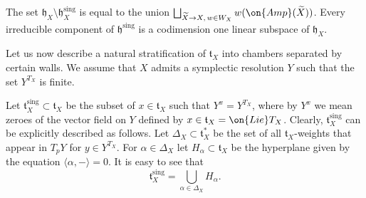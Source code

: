\documentclass[12pt]{amsart}
\begin{document}
\begin{prop}\label{namikawa's result_descr_of_h_sing}
The set $\mathfrak{h}_X \setminus \mathfrak{h}^{\mathrm{sing}}_X$ is equal to the union $\bigsqcup_{\widetilde{X} \rightarrow X,\, w\in W_{X}} w(\on{Amp}(\widetilde{X}))$. Every irreducible component of $\mathfrak{h}^{\mathrm{sing}}$ is a codimension one linear subspace of $\mathfrak{h}_X$.
\end{prop}



Let us now describe a natural stratification of $\mathfrak{t}_X$ into chambers separated by certain walls. 
We assume that $X$ admits a symplectic resolution $Y$ such that the set $Y^{T_X}$ is finite.


Let $\mathfrak{t}_X^{\mathrm{sing}} \subset \mathfrak{t}_X$ be the subset of  $x \in \mathfrak{t}_X$ such that $Y^{x}=Y^{T_X}$, where by $Y^x$ we mean zeroes of the vector field on $Y$ defined by $x \in \mathfrak{t}_X = \on{Lie}T_X$. Clearly, $\mathfrak{t}_X^{\mathrm{sing}}$ can be explicitly described as follows. Let $\Delta_X \subset \mathfrak{t}_{X}^*$ be the set of all $\mathfrak{t}_X$-weights that appear in $T_{p}Y$ for $y \in Y^{T_X}$. For $\alpha \in \Delta_X$ let $H_{\alpha} \subset \mathfrak{t}_X$ be the hyperplane given by the equation $\langle \alpha,-\rangle = 0$. It is easy to see that 
\begin{equation*}
\mathfrak{t}_{X}^{\mathrm{sing}} = \bigcup_{\alpha \in \Delta_X}H_{\alpha}.
\end{equation*}
\end{document}
